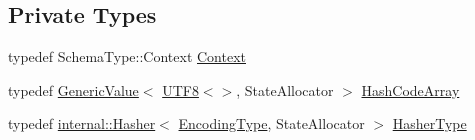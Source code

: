 \subsection*{Private Types}
\begin{DoxyCompactItemize}
\item 
typedef Schema\+Type\+::\+Context \mbox{\hyperlink{classrapidjson_1_1_generic_schema_validator_ae76e4602ce2ef7070a57f0df5bb07e76}{Context}}
\item 
typedef \mbox{\hyperlink{classrapidjson_1_1_generic_value}{Generic\+Value}}$<$ \mbox{\hyperlink{structrapidjson_1_1_u_t_f8}{U\+T\+F8}}$<$$>$, State\+Allocator $>$ \mbox{\hyperlink{classrapidjson_1_1_generic_schema_validator_accbaacbf17bf5fbdb4fb5ef74be76aba}{Hash\+Code\+Array}}
\item 
typedef \mbox{\hyperlink{classrapidjson_1_1internal_1_1_hasher}{internal\+::\+Hasher}}$<$ \mbox{\hyperlink{classrapidjson_1_1_generic_schema_validator_abaea0f74722261f6dde0db65594efdfe}{Encoding\+Type}}, State\+Allocator $>$ \mbox{\hyperlink{classrapidjson_1_1_generic_schema_validator_a5a038fcb26421e86937c6058ebc3e774}{Hasher\+Type}}
\end{DoxyCompactItemize}

